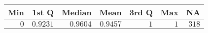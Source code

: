\begin{center}
\begin{tabular}{rrrrrrr}
\hline\hline
\multicolumn{1}{c}{Min}&\multicolumn{1}{c}{1st Q}&\multicolumn{1}{c}{Median}&\multicolumn{1}{c}{Mean}&\multicolumn{1}{c}{3rd Q}&\multicolumn{1}{c}{Max}&\multicolumn{1}{c}{NA}\tabularnewline
\hline
$0$&$0.9231$&$0.9604$&$0.9457$&$1$&$1$&$318$\tabularnewline
\hline
\end{tabular}\end{center}
